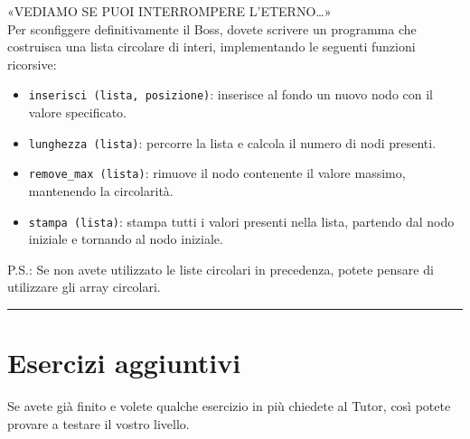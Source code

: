 \documentclass[a4paper]{article}
\begin{document}
«VEDIAMO SE PUOI INTERROMPERE L’ETERNO…»\\
Per sconfiggere definitivamente il Boss, dovete scrivere un programma che costruisca una lista circolare di interi, implementando le seguenti funzioni ricorsive:
\begin{itemize}
    \item \texttt{inserisci (lista, posizione)}: inserisce al fondo un nuovo nodo con il valore specificato.
    \item \texttt{lunghezza (lista)}: percorre la lista e calcola il numero di nodi presenti.
    \item \texttt{remove\_max (lista)}: rimuove il nodo contenente il valore massimo, mantenendo la circolarità.
    \item \texttt{stampa (lista)}: stampa tutti i valori presenti nella lista, partendo dal nodo iniziale e tornando al nodo iniziale.
\end{itemize}
P.S.: Se non avete utilizzato le liste circolari in precedenza, potete pensare di utilizzare gli array circolari.

\noindent\rule{\linewidth}{0.4pt}
\section*{Esercizi aggiuntivi}
Se avete già finito e volete qualche esercizio in più chiedete al Tutor, così potete provare a testare il vostro livello.
\end{document}
